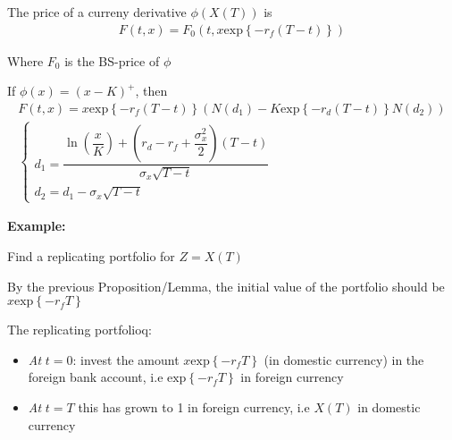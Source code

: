 \par\bigskip
\begin{lem}[]{}
  The price of a curreny derivative $\phi(X(T))$ is 
  \begin{equation*}
    \begin{gathered}
      F(t,x) = F_0(t,x\text{exp}\left\{-r_f(T-t)\right\})
    \end{gathered}
  \end{equation*}\par
  \noindent Where $F_0$ is the BS-price of $\phi$
  \par\bigskip
  \noindent If $\phi(x) = (x-K)^+$, then
  \begin{equation*}
    \begin{gathered}
      F(t,x) = x\text{exp}\left\{-r_f(T-t)\right\}\left(N(d_1)-K\text{exp}\left\{-r_d(T-t)\right\}N(d_2)\right)\\
      \begin{cases}
        d_1 = \dfrac{\ln{\left(\dfrac{x}{K}\right)}+\left(r_d-r_f+\dfrac{\sigma_x^2}{2}\right)(T-t)}{\sigma_x\sqrt{T-t}}\\
        d_2 = d_1-\sigma_x\sqrt{T-t}
      \end{cases}
    \end{gathered}
  \end{equation*}
\end{lem}
\par\bigskip
\noindent\textbf{Example:}\par
\noindent Find a replicating portfolio for $Z = X(T)$\par
\noindent By the previous Proposition/Lemma, the initial value of the portfolio should be $x\text{exp}\left\{-r_fT\right\}$\par
\noindent The replicating portfolioq:\par
\begin{itemize}
  \item\textit{At } $t=0$: invest the amount $x\text{exp}\left\{-r_fT\right\}$ (in domestic currency) in the foreign bank account, i.e $\text{exp}\left\{-r_fT\right\}$ in foreign currency\par
  \item\textit{At } $t=T$ this has grown to 1 in foreign currency, i.e $X(T)$ in domestic currency
\end{itemize}
